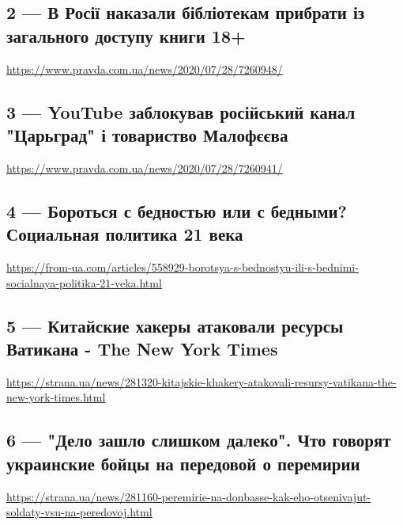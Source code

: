 \subsection{2 --- В Росії наказали бібліотекам прибрати із загального доступу книги 18+}
\url{https://www.pravda.com.ua/news/2020/07/28/7260948/}

\subsection{3 --- YouTube заблокував російський канал "Царьград" і товариство Малофєєва}
\url{https://www.pravda.com.ua/news/2020/07/28/7260941/}

\subsection{4 --- Бороться с бедностью или с бедными? Социальная политика 21 века}
\url{https://from-ua.com/articles/558929-borotsya-s-bednostyu-ili-s-bednimi-socialnaya-politika-21-veka.html}

\subsection{5 --- Китайские хакеры атаковали ресурсы Ватикана - The New York Times}
\url{https://strana.ua/news/281320-kitajskie-khakery-atakovali-resursy-vatikana-the-new-york-times.html}

\subsection{6 --- "Дело зашло слишком далеко". Что говорят украинские бойцы на передовой о перемирии}
\url{https://strana.ua/news/281160-peremirie-na-donbasse-kak-eho-otsenivajut-soldaty-vsu-na-peredovoj.html}

 
